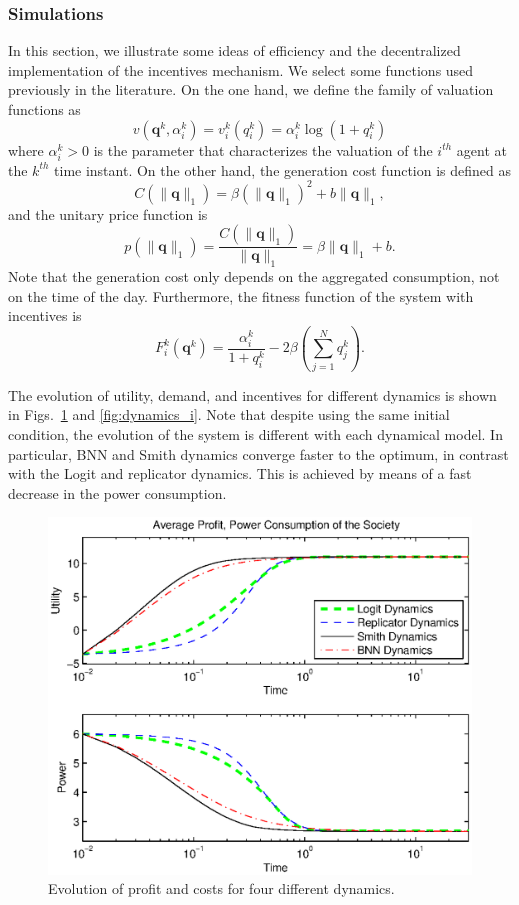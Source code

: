 \documentclass[a4paper,10pt]{article}
\def\th{^{th}}
\newcommand{\bs}[1]{\boldsymbol{#1}}
\def\th{^{th}}
\begin{document}
\subsubsection{Simulations}

In this section, we illustrate some ideas of efficiency and the decentralized implementation of the incentives mechanism. We select some functions used previously in the literature. On the one hand, we define the family of valuation functions as 
\begin{equation}\label{eq:valuation_sim}
 v(\bs{q}^k,\alpha_i^k) = v_i^k (q_i^k) = \alpha_i^k \log(1+q_i^k)
\end{equation}
where $\alpha_i^k>0$ is the parameter that characterizes the valuation of the  $i\th$ agent at the $k\th$ time instant.
On the other hand, the generation cost function is defined as 
%
\begin{equation}\label{eq:cost_sim}
 C(\|\bs{q}\|_1) = \beta ({\|\bs{q}\|_1})^2 + b {\|\bs{q}\|_1},
\end{equation}
and the unitary price function is
%
\begin{equation}\label{eq:p_sim}
 p(\|\bs{q}\|_1) = \frac{C(\|\bs{q}\|_1)}{\|\bs{q}\|_1} = \beta \|\bs{q}\|_1 + b.
\end{equation}
%
Note that the generation cost only depends on the aggregated consumption, not on the time of the day. Furthermore, 
%
the fitness function of the system with incentives is
%
\begin{equation}\label{eq:fitness_without_i_sim}
F_i^k( \bs{q}^k)  =  \frac{\alpha_i^k }{1+q_i^k}
 - 2\beta \left( \sum_{j=1}^N q_j^k  \right).
 \end{equation}


The evolution of utility, demand, and incentives for different dynamics is shown in Figs.~\ref{fig:dynamics_u} and \ref{fig:dynamics_i}. Note that despite using the same initial condition, the evolution of the system is different with each dynamical model. In particular, BNN and Smith dynamics converge faster to the  optimum, in contrast with the Logit and replicator dynamics. 
This is achieved by means of a fast decrease in the power consumption. 

\begin{figure}[hbt]
 \centering
 \includegraphics[width=.75\textwidth]{./images/evolution_u.eps}
 \caption{Evolution of profit and costs for four different dynamics.}
 \label{fig:dynamics_u}
\end{figure}
\end{document}
